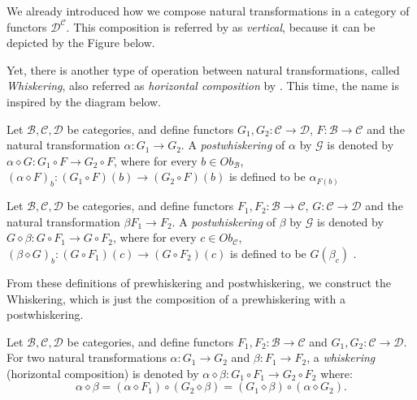We already introduced how we compose natural transformations in
a category of functors $\mathcal D^{\mathcal C}$. This composition
is referred by \citet{spivak2014category} as \textit{vertical}, because
it can be depicted by the Figure below.

Yet, there is another type of operation between natural transformations,
called \textit{Whiskering}, also referred as \textit{horizontal composition}
by \citet{spivak2014category}. This time, the name is inspired by
the diagram below.

\begin{definition}[Prewhiskering]
  Let $\mathcal B, \mathcal C, \mathcal D$ be categories, and define
  functors $G_1,G_2:\mathcal C \to \mathcal D$,
  $F:\mathcal B \to \mathcal C$ and the natural transformation
  $\alpha: G_1 \to G_2$.
  A \textit{postwhiskering}
  of $\alpha$ by $\mathcal G$ is denoted by $\alpha \diamond G:G_1 \circ F \to G_2 \circ F$,
  where for every $b \in Ob_\mathcal B$, $(\alpha \diamond F)_b:(G_1 \circ F)(b) \to (G_2 \circ F)(b)$
  is defined to be $\alpha_{F(b)}$ 
  \label{def:prewhiskering}
\end{definition}

\begin{definition}[Postwhiskering]
  Let $\mathcal B, \mathcal C, \mathcal D$ be categories, and define
  functors $F_1,F_2:\mathcal B \to \mathcal C$,
  $G:\mathcal C \to \mathcal D$ and the natural transformation
  $\beta F_1 \to F_2$.
  A \textit{postwhiskering}
  of $\beta$ by $\mathcal G$ is denoted by $G \diamond \beta:G \circ F_1 \to G \circ F_2$,
  where for every $c \in Ob_\mathcal C$, $(\beta \diamond G)_b:(G \circ F_1)(c) \to (G \circ F_2)(c)$
  is defined to be $G(\beta_c)$ .
  \label{def:postwhiskering}
\end{definition}

From these definitions of prewhiskering and postwhiskering, we construct the Whiskering,
which is just the composition of a prewhiskering with a postwhiskering.

\begin{definition}
  Let $\mathcal B, \mathcal C, \mathcal D$ be categories, and define
  functors $F_1,F_2:\mathcal B \to \mathcal C$ and
  $G_1, G_2 :\mathcal C \to \mathcal D$. For two natural transformations
  $\alpha: G_1 \to G_2$ and $\beta: F_1 \to F_2$,
  a \textit{whiskering} (horizontal composition)
  is denoted by
  $\alpha \diamond \beta: G_1\circ F_1 \rightarrow G_2 \circ F_2$
  where:
  \begin{displaymath}
  \alpha \diamond \beta
  = (\alpha \diamond F_1) \circ (G_2 \diamond \beta)
  = (G_1 \diamond \beta) \circ (\alpha \diamond G_2).
  \end{displaymath}
  \label{def:Whiskering}
\end{definition}

